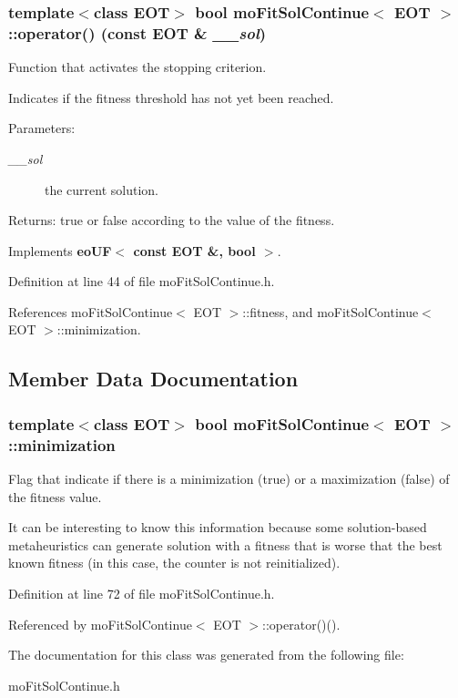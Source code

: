 \subsubsection{\setlength{\rightskip}{0pt plus 5cm}template$<$class EOT$>$ bool {\bf moFitSolContinue}$<$ EOT $>$::operator() (const EOT \& {\em \_\-\_\-sol})\hspace{0.3cm}{\tt  [inline, virtual]}}\label{classmo_fit_sol_continue_fa9f0a15f99c998115cae9b456403a27}


Function that activates the stopping criterion. 

Indicates if the fitness threshold has not yet been reached.

\begin{Desc}
\item[Parameters:]
\begin{description}
\item[{\em \_\-\_\-sol}]the current solution. \end{description}
\end{Desc}
\begin{Desc}
\item[Returns:]true or false according to the value of the fitness. \end{Desc}


Implements {\bf eoUF$<$ const EOT \&, bool $>$}.

Definition at line 44 of file moFitSolContinue.h.

References moFitSolContinue$<$ EOT $>$::fitness, and moFitSolContinue$<$ EOT $>$::minimization.

\subsection{Member Data Documentation}
\subsubsection{\setlength{\rightskip}{0pt plus 5cm}template$<$class EOT$>$ bool {\bf moFitSolContinue}$<$ EOT $>$::{\bf minimization}\hspace{0.3cm}{\tt  [private]}}\label{classmo_fit_sol_continue_a4c90279f00774d9868a2e38ead45696}


Flag that indicate if there is a minimization (true) or a maximization (false) of the fitness value. 

It can be interesting to know this information because some solution-based metaheuristics can generate solution with a fitness that is worse that the best known fitness (in this case, the counter is not reinitialized). 

Definition at line 72 of file moFitSolContinue.h.

Referenced by moFitSolContinue$<$ EOT $>$::operator()().

The documentation for this class was generated from the following file:\begin{CompactItemize}
\item 
moFitSolContinue.h\end{CompactItemize}
